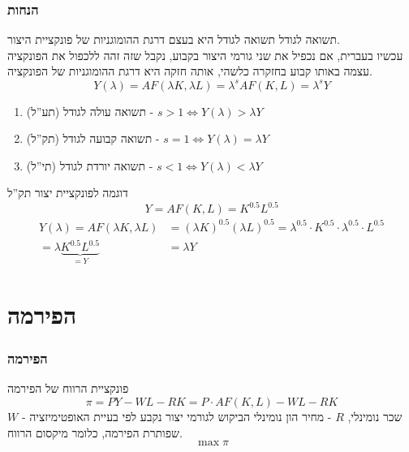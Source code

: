 \documentclass[usenames,dvipsnames]{beamer}
\begin{document}
\begin{RTL}
\begin{frame}
    \end{frame}

    \begin{frame}[allowframebreaks]
        \frametitle{הנחות}
        \begin{block}{תשואה לגודל}
            תשואה לגודל היא בעצם דרגת ההומוגניות של פונקציית היצור. \\ 
            עכשיו בעברית, אם נכפיל את שני גורמי היצור בקבוע, נקבל שזה זהה ללכפול את הפונקציה עצמה באותו קבוע בחזקרה כלשהי, אותה חזקה היא דרגת ההומוגניות של הפונקציה.
            $$Y(\lambda) = AF(\lambda K, \lambda L) = \lambda^{s} AF(K,L) = \lambda^s Y $$
        \end{block}

        \begin{enumerate}
            \item תשואה עולה לגודל (תע''ל) - $s>1 \Longleftrightarrow  Y(\lambda) > \lambda Y $ 
            \item תשואה קבועה לגודל (תק''ל) - $s = 1 \Longleftrightarrow  Y(\lambda) = \lambda Y $
            \item תשואה יורדת לגודל (תי''ל) - $s<1 \Longleftrightarrow  Y(\lambda) < \lambda Y $
        \end{enumerate}
        
        \framebreak

        \begin{exampleblock}{דוגמה לפונקציית יצור תק''ל} 
            $$Y = AF(K,L) = K^{0.5} L^{0.5}$$
        \begin{align*}
            Y(\lambda) = AF(\lambda K , \lambda L ) &= (\lambda K )^{0.5} (\lambda L ) ^{0.5} = \lambda^{0.5} \cdot K ^{0.5} \cdot  \lambda ^{0.5} \cdot L ^{0.5} \\ =\lambda \underbrace{K^{0.5} L^{0.5}}_{=Y} &= \lambda Y
        \end{align*}
            
        \end{exampleblock}
    
    \end{frame}

    \section{הפירמה }
    \begin{frame}[allowframebreaks]
        \frametitle{הפירמה}
        \begin{block}{פונקציית הרווח של הפירמה}
            $$\pi = PY - WL - RK = P \cdot AF(K,L) - WL - RK $$
            $W$ - שכר נומינלי, $R$ - מחיר הון נומינלי
            הביקוש לגורמי יצור נקבע לפי בעיית האופטימיזציה שפותרת הפירמה, כלומר מיקסום הרווח.
            $$\max \pi$$


\end{block}
\end{frame}
\end{RTL}
\end{document}
